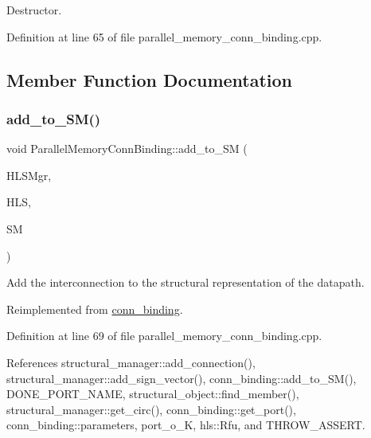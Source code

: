 Destructor. 



Definition at line 65 of file parallel\+\_\+memory\+\_\+conn\+\_\+binding.\+cpp.



\subsection{Member Function Documentation}
\mbox{\label{classParallelMemoryConnBinding_a269ef0bbe0925ec814787b9d3b5a54bf}} 
\subsubsection{\texorpdfstring{add\+\_\+to\+\_\+\+S\+M()}{add\_to\_SM()}}
{\footnotesize\ttfamily void Parallel\+Memory\+Conn\+Binding\+::add\+\_\+to\+\_\+\+SM (\begin{DoxyParamCaption}\item[{const \hyperlink{hls__manager_8hpp_acd3842b8589fe52c08fc0b2fcc813bfe}{H\+L\+S\+\_\+manager\+Ref}}]{H\+L\+S\+Mgr,  }\item[{const \hyperlink{hls_8hpp_a75d0c73923d0ddfa28c4843a802c73a7}{hls\+Ref}}]{H\+LS,  }\item[{const \hyperlink{structural__manager_8hpp_ab3136f0e785d8535f8d252a7b53db5b5}{structural\+\_\+manager\+Ref}}]{SM }\end{DoxyParamCaption})\hspace{0.3cm}{\ttfamily [virtual]}}



Add the interconnection to the structural representation of the datapath. 



Reimplemented from \hyperlink{classconn__binding_aaf898285e246aa69fd49c271cfb8b0bc}{conn\+\_\+binding}.



Definition at line 69 of file parallel\+\_\+memory\+\_\+conn\+\_\+binding.\+cpp.



References structural\+\_\+manager\+::add\+\_\+connection(), structural\+\_\+manager\+::add\+\_\+sign\+\_\+vector(), conn\+\_\+binding\+::add\+\_\+to\+\_\+\+S\+M(), D\+O\+N\+E\+\_\+\+P\+O\+R\+T\+\_\+\+N\+A\+ME, structural\+\_\+object\+::find\+\_\+member(), structural\+\_\+manager\+::get\+\_\+circ(), conn\+\_\+binding\+::get\+\_\+port(), conn\+\_\+binding\+::parameters, port\+\_\+o\+\_\+K, hls\+::\+Rfu, and T\+H\+R\+O\+W\+\_\+\+A\+S\+S\+E\+RT.

